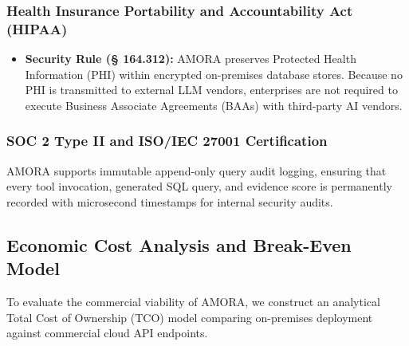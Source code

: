\subsubsection{Health Insurance Portability and Accountability Act (HIPAA)}
\begin{itemize}
    \item \textbf{Security Rule (§ 164.312):} AMORA preserves Protected Health Information (PHI) within encrypted on-premises database stores. Because no PHI is transmitted to external LLM vendors, enterprises are not required to execute Business Associate Agreements (BAAs) with third-party AI vendors.
\end{itemize}

\subsubsection{SOC 2 Type II and ISO/IEC 27001 Certification}
AMORA supports immutable append-only query audit logging, ensuring that every tool invocation, generated SQL query, and evidence score is permanently recorded with microsecond timestamps for internal security audits.

\subsection{Economic Cost Analysis and Break-Even Model}
To evaluate the commercial viability of AMORA, we construct an analytical Total Cost of Ownership (TCO) model comparing on-premises deployment against commercial cloud API endpoints.

